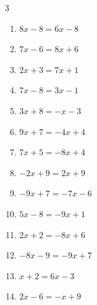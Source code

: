 \begin{multicols}{3}
\begin{enumerate}
  \item $8x-8=6x-8$

        \phantom{$\displaystyle x=0$}

  \item $7x-6=8x+6$

        \phantom{$\displaystyle x=-12$}

  \item $2x+3=7x+1$


  \item $7x-8=3x-1$


  \item $3x+8=-x-3$


  \item $9x+7=-4x+4$


  \item $7x+5=-8x+4$


  \item $-2x+9=2x+9$

        \phantom{$\displaystyle x=0$}

  \item $-9x+7=-7x-6$


  \item $5x-8=-9x+1$


\columnbreak %

\resetques

  \item $2x+2=-8x+6$


  \item $-8x-9=-9x+7$

        \phantom{$\displaystyle x=16$}

  \item $x+2=6x-3$

        \phantom{$\displaystyle x=1$}

  \item $2x-6=-x+9$


\end{enumerate}
\end{multicols}
